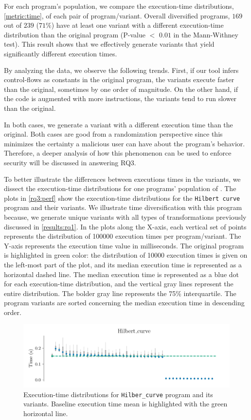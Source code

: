 For each program's population, we compare the execution-time distributions, \autoref{metric:time}, of each pair of program/variant.
Overall diversified programs, $169$ out of $239$ ($71\%$) have at least one variant with a different execution-time distribution than the original program (P-value $<$ $0.01$ in the Mann-Withney test). This result shows that we effectively generate variants that yield significantly different execution times.

By analyzing the data, we observe the following trends. First, if our tool infers control-flows as constants in the original program, the variants execute faster than the original, sometimes by one order of magnitude. On the other hand, if the code is augmented with more instructions, the variants tend to run slower than the original. 

In both cases, we generate a variant with a different execution time than the original. Both cases are good from a randomization perspective since this minimizes the certainty a malicious user can have about the program's behavior. Therefore, a deeper analysis of how this phenomenon can be used to enforce security will be discussed in answering RQ3.

To better illustrate the differences between executions times in the variants, we dissect the execution-time distributions for one programs' population of \corpusrosetta. The plots in \autoref{rq3:perf} show the execution-time distributions for the \texttt{Hilbert curve} program and their variants. 
We illustrate time diversification with this program because, we generate unique variants with all types of transformations previously discussed in \autoref{results:rq1}.
In the plots along the X-axis, each vertical set of points represents the distribution of 100000 execution times per program/variant. The Y-axis represents the execution time value in milliseconds. The original program is highlighted in green color: the distribution of 10000 execution times is given on the left-most part of the plot, and its median execution time is represented as a horizontal dashed line. The median execution time is represented as a blue dot for each execution-time distribution, and the vertical gray lines represent the entire distribution. The bolder gray line represents the 75\% interquartile. The program variants are sorted concerning the median execution time in descending order.

\begin{figure}[h]
    \centering
    \includegraphics[width=\linewidth]{plots/hilbert_curve.pdf}
    \caption{Execution-time distributions for \texttt{Hilber\_curve} program and its variants. Baseline execution time mean is highlighted with the green horizontal line. }
    \label{rq3:perf}
\end{figure}

